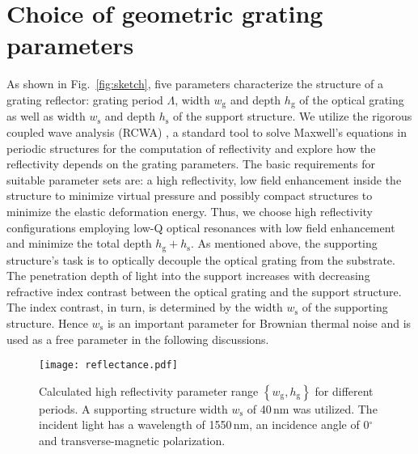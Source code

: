 \documentclass[twocolumn,secnumarabic,amssymb, nobibnotes, aps, prd, showpacs]{revtex4-1}
\begin{document}
\section{Choice of geometric grating parameters}
\label{sec:params}

\noindent As shown in Fig.~\ref{fig:sketch}, five parameters characterize the structure of a grating reflector: grating period $\Lambda$, width $w_\mathrm{g}$ and depth $h_\mathrm{g}$ of the optical grating as well as width $w_\mathrm{s}$ and depth $h_\mathrm{s}$ of the support structure. We utilize the rigorous coupled wave analysis (RCWA) \cite{Moh1981}, a standard tool to solve Maxwell's equations in periodic structures for the computation of reflectivity and explore 
how the reflectivity depends on the grating parameters. The basic requirements for suitable parameter sets are: a high reflectivity, low field enhancement inside the structure to minimize virtual pressure and possibly compact structures to minimize the elastic deformation energy. Thus, we choose high reflectivity configurations employing low-Q optical resonances with low field enhancement \cite{Kar2012} and minimize the total depth $h_\mathrm{g}+h_\mathrm{s}$. As mentioned above, the supporting structure's task is to optically decouple the optical grating from the substrate. The penetration depth of light into the support increases with decreasing refractive index contrast between the optical grating and the support structure. The index contrast, in turn, is determined by the width $w_\mathrm{s}$ of the supporting structure. Hence $w_\mathrm{s}$ is an important parameter for Brownian thermal noise and is used as a free parameter in the following discussions. \newline
\begin{figure}[tb]
	\centering
		\texttt{[image: reflectance.pdf]}
	\caption{Calculated high reflectivity parameter range $\left\{w_\mathrm{g},h_\mathrm{g}\right\}$ for different periods. A supporting structure width $w_\mathrm{s}$ of 40\,nm was utilized. The incident light has a wavelength of 1550\,nm, an incidence angle of 0$^\mathrm{\circ}$ and transverse-magnetic polarization.}
	\label{fig:reflectance}
\end{figure}
\end{document}
